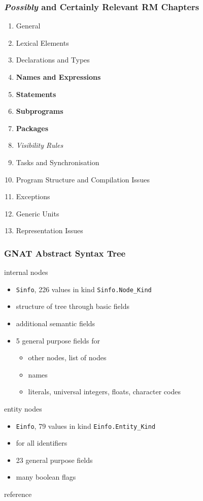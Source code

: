 \documentclass{beamer}
\newenvironment{specialframe}{%
  \begin{frame}[fragile,environment=specialframe]}{\end{frame}}
\begin{document}
\begin{specialframe}
  \frametitle{\textit{Possibly} and \textbf{Certainly} Relevant RM Chapters}

\begin{enumerate}
\item General
\item Lexical Elements
\item Declarations and Types
\item \textbf{Names and Expressions}
\item \textbf{Statements}
\item \textbf{Subprograms}
\item \textbf{Packages}
\item \textit{Visibility Rules}
\item Tasks and Synchronisation
\item Program Structure and Compilation Issues
\item Exceptions
\item Generic Units
\item Representation Issues
\end{enumerate}

\end{specialframe}

\begin{specialframe}
  \frametitle{GNAT Abstract Syntax Tree}

\begin{block}{internal nodes}
  \begin{itemize}
  \item \verb|Sinfo|, 226 values in kind \verb|Sinfo.Node_Kind|
  \item structure of tree through basic fields
  \item additional semantic fields
  \item 5 general purpose fields for
    \begin{itemize}
    \item other nodes, list of nodes
    \item names
    \item literals, universal integers, floats, character codes
    \end{itemize}
  \end{itemize}
\end{block}

\begin{block}{entity nodes}
  \begin{itemize}
  \item \verb|Einfo|, 79 values in kind \verb|Einfo.Entity_Kind|
  \item for all identifiers
  \item 23 general purpose fields
  \item many boolean flags
  \end{itemize}
\end{block}

reference
\end{specialframe}
\end{document}
